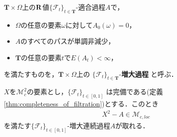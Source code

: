 	\begin{screen}
		\begin{dfn}[増大過程]
			$\mathbf{T} \times \Omega$上の$\mathbf{R}$値$\{\mathscr{F}_t\}_{t \in \mathbf{T}}$-適合過程$A$で，
			\begin{itemize}
				\item $\Omega$の任意の要素$\omega$に対して$A_0(\omega) = 0$，
				\item $A$のすべてのパスが単調非減少，
				\item $\mathbf{T}$の任意の要素$t$で$E(A_t) < \infty$，
			\end{itemize}
			を満たすものを，$\mathbf{T} \times \Omega$上の
			$\{\mathscr{F}_t\}_{t \in \mathbf{T}}$-{\bf 増大過程}
			と呼ぶ．
		\end{dfn}
	\end{screen}
	
	\begin{screen}
		\begin{thm}[局所マルチンゲールの二乗過程は増大過程と局所マルチンゲールに分解できる]
		\label{thm:decomposition_of_local_martingales}
			$X$を$\mathscr{M}_{c}^{2}$の要素とし，$\{\mathscr{F}_{t}\}_{t \in [0,1]}$
			は完備である(定義\ref{thm:completeness_of_filtration})とする．このとき
			\begin{align}
				X^{2} - A \in \mathscr{M}_{c,loc}
			\end{align}
			を満たす$\{\mathscr{F}_{t}\}_{t \in [0,1]}$-増大連続過程$A$が取れる．
		\end{thm}
	\end{screen}
	
